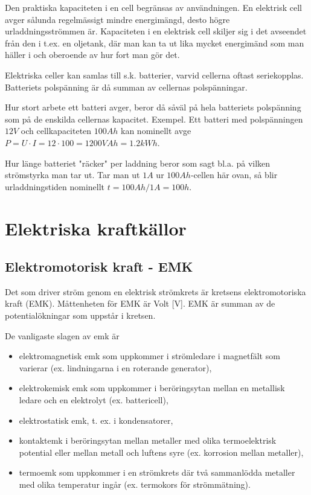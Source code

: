 \documentclass[a4paper,twoside,twocolumn,openright]{book}
\begin{document}
Den praktiska kapaciteten i en cell begränsas av användningen. En elektrisk cell
avger sålunda regelmässigt mindre energimängd, desto högre urladdningsströmmen
är. Kapaciteten i en elektrisk cell skiljer sig i det avseendet från den i t.ex. en
oljetank, där man kan ta ut lika mycket energimänd som man häller i och oberoende av hur
fort man gör det.


Elektriska celler kan samlas till s.k. batterier, varvid cellerna oftast seriekopplas.
Batteriets polspänning är då summan av cellernas polspänningar.

Hur stort arbete ett batteri avger, beror då såväl på hela batteriets polspänning som på
de enskilda cellernas kapacitet.
Exempel.
Ett batteri med polspänningen $12 V$ och cellkapaciteten $100 Ah$ kan nominellt avge
$P = U \cdot I = 12 \cdot 100 = 1200 VAh = 1.2kWh$.

Hur länge batteriet "räcker" per laddning beror som sagt bl.a. på vilken strömstyrka
man tar ut. Tar man ut $1 A$ ur $100 Ah$-cellen här ovan, så blir urladdningstiden
nominellt $t = 100 Ah/1 A = 100 h$.

\cleardoublepage

\section{Elektriska kraftkällor}

\subsection{Elektromotorisk kraft - EMK}

Det som driver ström genom en elektrisk strömkrets är kretsens elektromotoriska kraft
(EMK).
Måttenheten för EMK är Volt [V]. EMK är summan av de potentialökningar som uppstår i
kretsen.

De vanligaste slagen av emk är
\begin{itemize}
\item elektromagnetisk emk som uppkommer i
strömledare i magnetfält som varierar
(ex. lindningarna i en roterande generator),
\item elektrokemisk emk som uppkommer i
beröringsytan mellan en metallisk ledare
och en elektrolyt (ex. battericell),
\item elektrostatisk emk, t. ex. i kondensatorer,
\item kontaktemk i beröringsytan mellan metaller med olika termoelektrisk potential
eller mellan metall och luftens syre (ex.
korrosion mellan metaller),
\item termoemk som uppkommer i en strömkrets där två sammanlödda metaller med
olika temperatur ingår (ex. termokors för
strömmätning).
\end{itemize}
\end{document}
